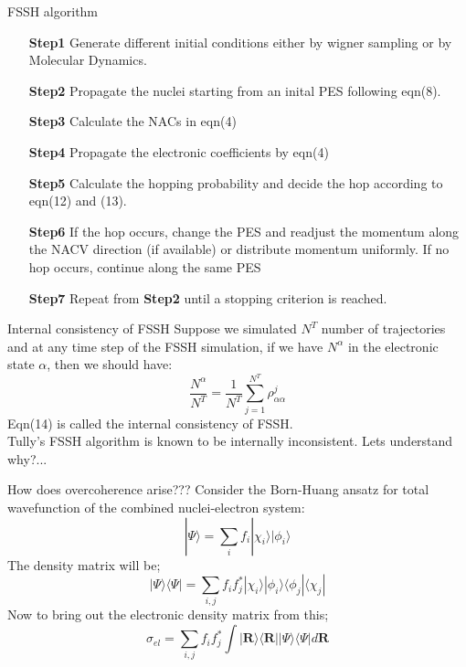 \documentclass{beamer}
\begin{document}
	\begin{frame}[t]{FSSH algorithm}
	\begin{enumerate}
	\item[\textbf{Step1}]{Generate different initial conditions either by wigner sampling or by Molecular Dynamics.}
	\item[\textbf{Step2}]{Propagate the nuclei starting from an inital PES following eqn(8).}
	\item[\textbf{Step3}]{Calculate the NACs in eqn(4)}
	\item[\textbf{Step4}]{Propagate the electronic coefficients by eqn(4)}
	\item[\textbf{Step5}]{Calculate the hopping probability and decide the hop according to eqn(12) and (13).}
	\item[\textbf{Step6}]{If the hop occurs, change the PES and readjust the momentum along the NACV direction (if available) or distribute momentum uniformly. If no hop occurs, continue along the same PES}
	\item[\textbf{Step7}]{Repeat from \textbf{Step2} until a stopping criterion is reached.}
	\end{enumerate}		
	\end{frame}
	
	\begin{frame}[t]{Internal consistency of FSSH}
	Suppose we simulated $N^T$ number of trajectories and at any time step of the FSSH simulation, if we have $N^\alpha$ in the electronic state $\alpha$, then we should have:
    \begin{equation}
	\frac{N^\alpha}{N^T} = \frac{1}{N^T}\sum_{j=1}^{N^T} \rho_{\alpha\alpha}^j
	\end{equation}
	Eqn(14) is called the internal consistency of FSSH.\\
	\vspace{1cm}
	Tully's FSSH algorithm is known to be internally inconsistent. Lets understand why?...
	
	\end{frame}
	
	\begin{frame}[t]{How does overcoherence arise???}
	Consider the Born-Huang ansatz for total wavefunction of the combined nuclei-electron system:
	\begin{equation}
	|\Psi\rangle = \sum_i f_i|\chi_i\rangle|\phi_i\rangle 
	\end{equation}
	The density matrix will be;
	\begin{equation}
	|\Psi\rangle\langle\Psi| = \sum_{i,j} f_if_j^*|\chi_i\rangle|\phi_i\rangle \langle\phi_j|\langle\chi_j|
	\end{equation}
	Now to bring out the electronic density matrix from this;
	\begin{equation}
	\sigma_{el} = \sum_{i,j} f_if_j^*\displaystyle\int|\textbf{R}\rangle\langle\textbf{R}||\Psi\rangle\langle\Psi| d\textbf{R}
	\end{equation}
	\end{frame}
\end{document}
